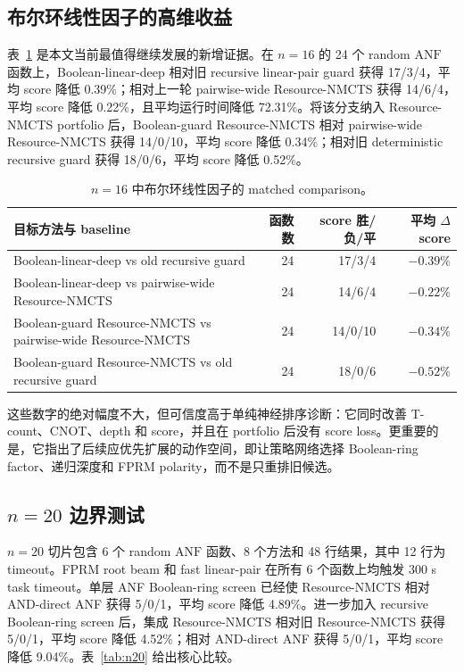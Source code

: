 \documentclass[UTF8,fontset=macnew,11pt]{ctexart}
\newcommand{\method}{Resource-NMCTS}
\newcommand{\anf}{\ensuremath{\mathrm{ANF}}}
\begin{document}
\subsection{布尔环线性因子的高维收益}

表~\ref{tab:boolean_ring} 是本文当前最值得继续发展的新增证据。在 $n=16$ 的 24 个 random \anf{} 函数上，Boolean-linear-deep 相对旧 recursive linear-pair guard 获得 17/3/4，平均 score 降低 0.39\%；相对上一轮 pairwise-wide \method{} 获得 14/6/4，平均 score 降低 0.22\%，且平均运行时间降低 72.31\%。将该分支纳入 \method{} portfolio 后，Boolean-guard \method{} 相对 pairwise-wide \method{} 获得 14/0/10，平均 score 降低 0.34\%；相对旧 deterministic recursive guard 获得 18/0/6，平均 score 降低 0.52\%。

\begin{table}[t]
\centering
\small
\caption{$n=16$ 中布尔环线性因子的 matched comparison。}
\label{tab:boolean_ring}
\begin{tabularx}{\linewidth}{>{\raggedright\arraybackslash}Xrrr}
\toprule
目标方法与 baseline & 函数数 & score 胜/负/平 & 平均 $\Delta$ score \\
\midrule
Boolean-linear-deep vs old recursive guard & 24 & 17/3/4 & $-0.39\%$ \\
Boolean-linear-deep vs pairwise-wide \method{} & 24 & 14/6/4 & $-0.22\%$ \\
Boolean-guard \method{} vs pairwise-wide \method{} & 24 & 14/0/10 & $-0.34\%$ \\
Boolean-guard \method{} vs old recursive guard & 24 & 18/0/6 & $-0.52\%$ \\
\bottomrule
\end{tabularx}
\end{table}

这些数字的绝对幅度不大，但可信度高于单纯神经排序诊断：它同时改善 T-count、CNOT、depth 和 score，并且在 portfolio 后没有 score loss。更重要的是，它指出了后续应优先扩展的动作空间，即让策略网络选择 Boolean-ring factor、递归深度和 FPRM polarity，而不是只重排旧候选。

\subsection{\texorpdfstring{$n=20$}{n=20} 边界测试}

$n=20$ 切片包含 6 个 random \anf{} 函数、8 个方法和 48 行结果，其中 12 行为 timeout。FPRM root beam 和 fast linear-pair 在所有 6 个函数上均触发 300 s task timeout。单层 ANF Boolean-ring screen 已经使 \method{} 相对 AND-direct ANF 获得 5/0/1，平均 score 降低 4.89\%。进一步加入 recursive Boolean-ring screen 后，集成 \method{} 相对旧 \method{} 获得 5/0/1，平均 score 降低 4.52\%；相对 AND-direct ANF 获得 5/0/1，平均 score 降低 9.04\%。表~\ref{tab:n20} 给出核心比较。
\end{document}
